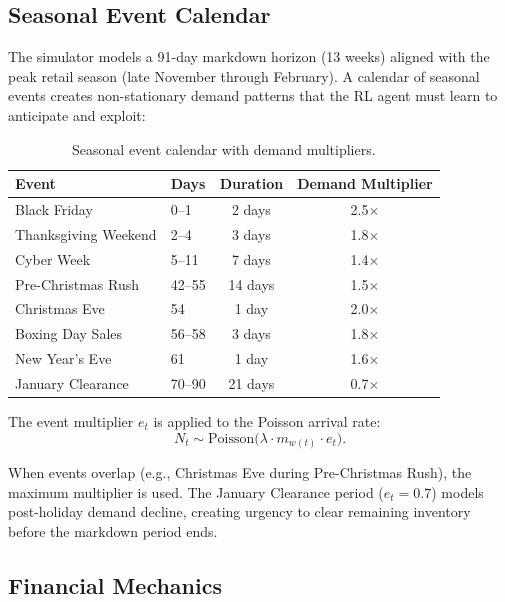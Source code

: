 \documentclass[11pt,a4paper]{article}
\begin{document}
\subsection{Seasonal Event Calendar}

The simulator models a 91-day markdown horizon (13 weeks) aligned with the peak retail season (late November through February).
A calendar of seasonal events creates non-stationary demand patterns that the RL agent must learn to anticipate and exploit:

\begin{table}[H]
\centering
\caption{Seasonal event calendar with demand multipliers.}
\begin{tabular}{@{}llcc@{}}
\toprule
\textbf{Event} & \textbf{Days} & \textbf{Duration} & \textbf{Demand Multiplier} \\
\midrule
Black Friday         & 0--1   & 2 days  & 2.5$\times$ \\
Thanksgiving Weekend & 2--4   & 3 days  & 1.8$\times$ \\
Cyber Week           & 5--11  & 7 days  & 1.4$\times$ \\
Pre-Christmas Rush   & 42--55 & 14 days & 1.5$\times$ \\
Christmas Eve        & 54     & 1 day   & 2.0$\times$ \\
Boxing Day Sales     & 56--58 & 3 days  & 1.8$\times$ \\
New Year's Eve       & 61     & 1 day   & 1.6$\times$ \\
January Clearance    & 70--90 & 21 days & 0.7$\times$ \\
\bottomrule
\end{tabular}
\end{table}

The event multiplier $e_t$ is applied to the Poisson arrival rate:
\begin{equation}
N_t \sim \mathrm{Poisson}\bigl(\lambda \cdot m_{w(t)} \cdot e_t\bigr).
\end{equation}

When events overlap (e.g., Christmas Eve during Pre-Christmas Rush), the maximum multiplier is used.
The January Clearance period ($e_t = 0.7$) models post-holiday demand decline, creating urgency to clear remaining inventory before the markdown period ends.

\subsection{Financial Mechanics}
\end{document}
